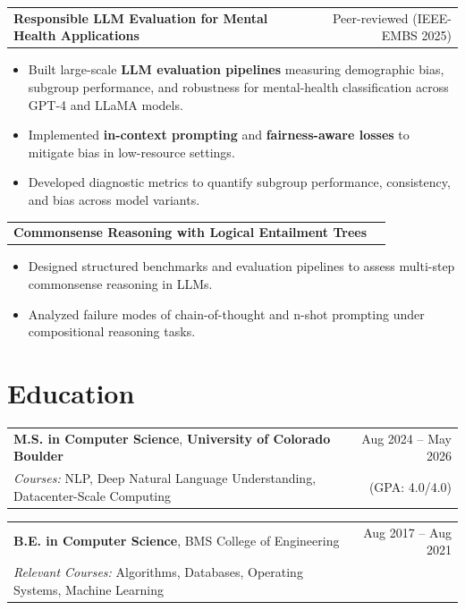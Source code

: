 \documentclass[a4paper,11pt]{article}
\begin{document}
\begin{tabularx}{\linewidth}{ @{}X r@{} }
  \textbf{Responsible LLM Evaluation for Mental Health Applications} & Peer-reviewed (IEEE-EMBS 2025)\\
\end{tabularx}
\begin{itemize}[nosep, after=\strut, leftmargin=1.5em, itemsep=2pt]
  \item Built large-scale \textbf{LLM evaluation pipelines} measuring demographic bias, subgroup performance, and robustness for mental-health classification across GPT-4 and LLaMA models.
  \item Implemented \textbf{in-context prompting} and \textbf{fairness-aware losses} to mitigate bias in low-resource settings.
  \item Developed diagnostic metrics to quantify subgroup performance, consistency, and bias across model variants.
\end{itemize}

\begin{tabularx}{\linewidth}{ @{}X r@{} }
  \textbf{Commonsense Reasoning with Logical Entailment Trees} & \\
\end{tabularx}
\begin{itemize}[nosep, after=\strut, leftmargin=1.5em, itemsep=2pt]
  \item Designed structured benchmarks and evaluation pipelines to assess multi-step commonsense reasoning in LLMs.
  \item Analyzed failure modes of chain-of-thought and n-shot prompting under compositional reasoning tasks.
\end{itemize}

\color{BlueViolet}
\section*{Education}
\color{black}
\begin{tabularx}{\linewidth}{@{}X r@{}}
\textbf{M.S. in Computer Science}, \textbf{University of Colorado Boulder} & Aug 2024 – May 2026 \\
\textit{Courses:} NLP, Deep Natural Language Understanding, Datacenter-Scale Computing & (GPA: 4.0/4.0)
\end{tabularx}
\begin{tabularx}{\linewidth}{@{}X r@{}}
\textbf{B.E. in Computer Science}, BMS College of Engineering & Aug 2017 – Aug 2021 \\
\textit{Relevant Courses:} Algorithms, Databases, Operating Systems, Machine Learning
\end{tabularx}
\end{document}
